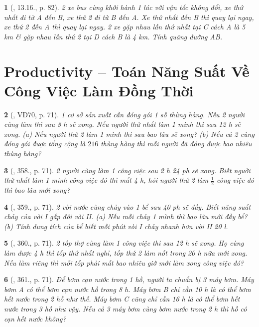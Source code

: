 \documentclass{article}
\newtheorem{baitoan}{}
\begin{document}
\begin{baitoan}[\cite{TLCT_THCS_Toan_6_so_hoc}, 13.16., p. 82]
	2 xe bus cùng khởi hành 1 lúc với vận tốc không đổi, xe thứ nhất đi từ A đến B, xe thứ 2 đi từ B đến A. Xe thứ nhất đến B thì quay lại ngay, xe thứ 2 đến A thì quay lại ngay. 2 xe gặp nhau lần thứ nhất tại C cách A là {\rm5 km} \& gặp nhau lần thứ 2 tại D cách B là {\rm4 km}. Tính quãng đường AB.
\end{baitoan}


\section{Productivity -- Toán Năng Suất Về Công Việc Làm Đồng Thời}

\begin{baitoan}[\cite{Tuyen_Toan_6}, VD70, p. 71]
	1 cơ sở sản xuất cần đóng gói 1 số thùng hàng. Nếu 2 người cùng làm thì sau {\rm8 h} sẽ xong. Nếu người thứ nhất làm 1 mình thì sau {\rm12 h} sẽ xong. (a) Nếu người thứ 2 làm 1 mình thì sau bao lâu sẽ xong? (b) Nếu cả 2 cùng đóng gói được tổng cộng là $216$ thùng hàng thì mỗi người đã đóng được bao nhiêu thùng hàng?
\end{baitoan}

\begin{baitoan}[\cite{Tuyen_Toan_6}, 358., p. 71]
	2 người cùng làm 1 công việc sau {\rm2 h 24 ph} sẽ xong. Biết người thứ nhất làm 1 mình công việc đó thì mất {\rm4 h}, hỏi người thứ 2 làm $\frac{1}{2}$ công việc đó thì bao lâu mới xong?
\end{baitoan}

\begin{baitoan}[\cite{Tuyen_Toan_6}, 359., p. 71]
	2 vòi nước cùng chảy vào 1 bể sau {\rm40 ph} sẽ đầy. Biết năng suất chảy của vòi I gấp đôi vòi II. (a) Nếu mỗi chảy 1 mình thì bao lâu mới đầy bể? (b) Tính dung tích của bể biết mỗi phút vòi I chảy nhanh hơn vòi II {\rm20 l}.
\end{baitoan}

\begin{baitoan}[\cite{Tuyen_Toan_6}, 360., p. 71]
	2 tốp thợ cùng làm 1 công việc thì sau {\rm12 h} sẽ xong. Họ cùng làm được {\rm4 h} thì tốp thứ nhất nghỉ, tốp thứ 2 làm nốt trong {\rm20 h} nữa mới xong. Nếu làm riêng thì mỗi tốp phải mất bao nhiêu giờ mới làm xong công việc đó?
\end{baitoan}

\begin{baitoan}[\cite{Tuyen_Toan_6}, 361., p. 71]
	Để bơm cạn nước trong 1 hồ, người ta chuẩn bị 3 máy bơm. Máy bơm A có thể bơm cạn nước hồ trong {\rm8 h}. Máy bơm B chỉ cần {\rm10 h} là có thể bơm hết nước trong 2 hồ như thế. Máy bơm C cũng chỉ cần {\rm16 h} là có thể bơm hết nước trong 3 hồ như vậy. Nếu cả 3 máy bơm cùng bơm nước trong {\rm2 h} thì hồ có cạn hết nước không?
\end{baitoan}
\end{document}
